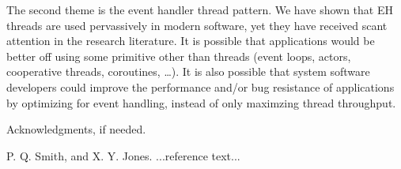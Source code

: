 \documentclass[11pt]{sigplanconf}
\begin{document}
The second theme is the event handler thread pattern.  We have shown
that EH threads are used pervassively in modern software, yet they have
received scant attention in the research literature.  It is possible
that applications would be better off using some primitive other than
threads (event loops, actors, cooperative threads, coroutines, \ldots).
It is also possible that system software developers could improve the
performance and/or bug resistance of applications by optimizing for
event handling, instead of only maximzing thread throughput.

\acks

Acknowledgments, if needed.





\begin{thebibliography}{}
\softraggedright

P. Q. Smith, and X. Y. Jones. ...reference text...

\end{thebibliography}
\end{document}

